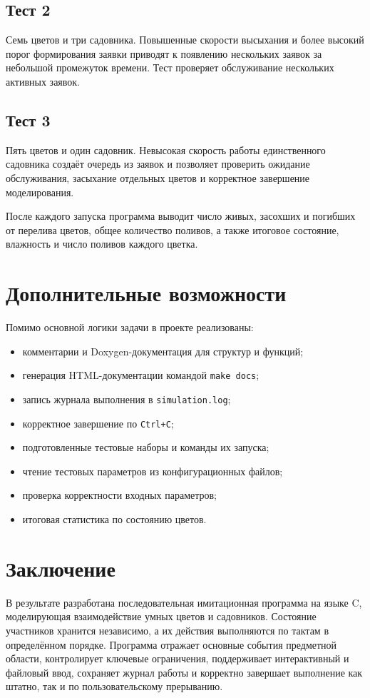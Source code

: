 \documentclass[12pt,a4paper]{article}
\begin{document}
\subsection*{Тест 2}
Семь цветов и три садовника. Повышенные скорости высыхания и более высокий
порог формирования заявки приводят к появлению нескольких заявок за небольшой
промежуток времени. Тест проверяет обслуживание нескольких активных заявок.

\subsection*{Тест 3}
Пять цветов и один садовник. Невысокая скорость работы единственного садовника создаёт очередь
из заявок и позволяет проверить ожидание обслуживания, засыхание отдельных
цветов и корректное завершение моделирования.

После каждого запуска программа выводит число живых, засохших и погибших от
перелива цветов, общее количество поливов, а также итоговое состояние,
влажность и число поливов каждого цветка.

\section{Дополнительные возможности}

Помимо основной логики задачи в проекте реализованы:
\begin{itemize}[noitemsep]
    \item комментарии и Doxygen-документация для структур и функций;
    \item генерация HTML-документации командой \texttt{make docs};
    \item запись журнала выполнения в \texttt{simulation.log};
    \item корректное завершение по \texttt{Ctrl+C};
    \item подготовленные тестовые наборы и команды их запуска;
    \item чтение тестовых параметров из конфигурационных файлов;
    \item проверка корректности входных параметров;
    \item итоговая статистика по состоянию цветов.
\end{itemize}

\section{Заключение}

В результате разработана последовательная имитационная программа на языке C,
моделирующая взаимодействие умных цветов и садовников. Состояние участников
хранится независимо, а их действия выполняются по тактам в определённом порядке.
Программа отражает основные события предметной области, контролирует ключевые
ограничения, поддерживает интерактивный и файловый ввод, сохраняет журнал работы
и корректно завершает выполнение как штатно, так и по пользовательскому
прерыванию.
\end{document}
